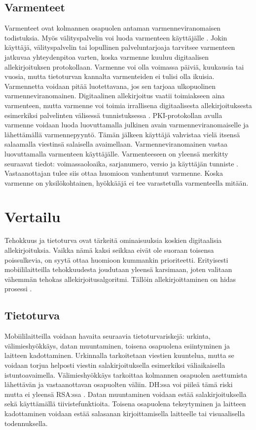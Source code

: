 \documentclass[finnish]{tktltiki2}
\theoremstyle{definition}
\theoremstyle{remark}
\begin{document}
\subsection{Varmenteet}

Varmenteet ovat kolmannen osapuolen antaman varmenneviranomaisen todistuksia. Myös välityspalvelin voi luoda varmenteen käyttäjälle \cite{proxy}. Jokin käyttäjä, välityspalvelin tai lopullinen palveluntarjoaja tarvitsee varmenteen jatkuvaa yhteydenpitoa varten, koska varmenne kuuluu digitaalisen allekirjoituksen protokollaan. Varmenne voi olla voimassa päiviä, kuukausia tai vuosia, mutta tietoturvan kannalta varmenteiden ei tulisi olla ikuisia. Varmennetta voidaan pitää luotettavana, jos sen tarjoaa ulkopuolinen varmenneviranomainen. Digitaalinen allekirjoitus vaatii toimiakseen aina varmenteen, mutta varmenne voi toimia irrallisena digitaalisesta allekirjoituksesta esimerkiksi palvelinten välisessä tunnistuksessa \cite{proxy}. PKI-protokollan avulla varmenne voidaan luoda luovuttamalla julkinen avain varmenneviranomaiselle ja lähettämällä varmennepyyntö. Tämän jälkeen käyttäjä vahvistaa vielä itsensä salaamalla viestinsä salaisella avaimellaan. Varmenneviranomainen vastaa luovuttamalla varmenteen käyttäjälle. Varmenteeseen on yleensä merkitty seuraavat tiedot: voimassaoloaika, sarjanumero, versio ja käyttäjän tunniste \cite{ECC}. Vastaanottajan tulee siis ottaa huomioon vanhentunut varmenne. Koska varmenne on yksilökohtainen, hyökkääjä ei tee varastetulla varmenteella mitään. 

\section{Vertailu}

Tehokkuus ja tietoturva ovat tärkeitä ominaisuuksia koskien digitaalisia allekirjoituksia. Vaikka nämä kaksi seikkaa eivät ole suoraan toisensa poissulkevia, on syytä ottaa huomioon kummankin prioriteetti. Erityisesti mobiililaitteilla tehokkuudesta joudutaan yleensä karsimaan, joten valitaan vähemmän tehokas allekirjoitusalgoritmi. Tällöin allekirjoittaminen on hidas prosessi \cite{proxy}.

\subsection{Tietoturva}

Mobiililaitteilla voidaan havaita seuraavia tietoturvariskejä: urkinta, välimieshyökkäys, datan muuntaminen, toisena osapuolena esiintyminen ja laitteen kadottaminen. Urkinnalla tarkoitetaan viestien kuuntelua, mutta se voidaan torjua helposti viestin salakirjoituksella esimerkiksi väliaikaisella istuntoavaimella. Välimieshyökkäys tarkoittaa kolmannen osapuolen asettumista lähettävän ja vastaanottavan osapuolten väliin. DH:ssa voi piileä tämä riski mutta ei yleensä RSA:ssa \cite{enti}. Datan muuntaminen voidaan estää salakirjoituksella sekä käyttämällä tiivistefunktioita. Toisena osapuolena tekeytyminen ja laitteen kadottaminen voidaan estää salasanan kirjoittamisella laitteelle tai visuaalisella todennuksella. 
\end{document}
